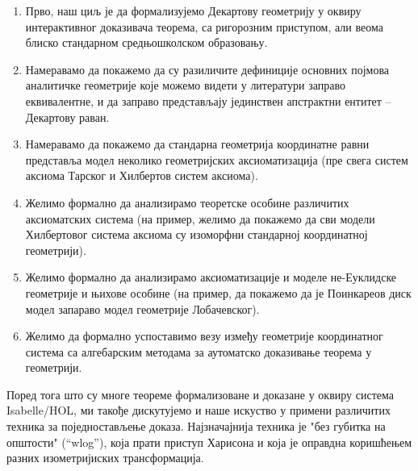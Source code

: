 \documentclass[a4paper, 12pt]{article}
\begin{document}
\begin{enumerate}
\item Прво, наш циљ је да формализујемо Декартову геометрију у оквиру
      интерактивног доказивача теорема, са ригорозним приступом, али веома блиско
      стандарном средњошколском образовању.
\item Намеравамо да покажемо да су разиличите дефиниције основних појмова
      аналитичке геометрије које можемо видети у литератури заправо еквивалентне,
      и да заправо представљају јединствен апстрактни ентитет -- Декартову раван.
\item Намеравамо да покажемо да стандарна геометрија координатне равни
      представља модел неколико геометријских аксиоматизација (пре свега
      систем аксиома Тарског и Хилбертов систем аксиома).
\item Желимо формално да анализирамо теоретске особине различитих аксиоматских система
      (на пример, желимо да покажемо да сви модели Хилбертовог система аксиома су
      изоморфни стандарној координатној геометрији).
\item Желимо формално да анализирамо аксиоматизације и моделе не-Еуклидске геометрије
      и њихове особине (на пример, да покажемо да је Поинкареов диск модел запараво модел
      геометрије Лобачевског).
\item Желимо да формално успоставимо везу између геометрије координатног система са
      алгебарским методама за аутоматско доказивање теорема у геометрији.
\end{enumerate}



Поред тога што су многе теореме формализоване и доказане у оквиру
система {\lat Isabelle/HOL}, ми такође дискутујемо и наше искуство у
примени различитих техника за поједностављење доказа.  Најзначајнија
техника је "без губитка на општости" (``{\lat wlog}''), која прати приступ
Харисона\cite{wlog} и која је оправдна коришћењем разних
изометријиских трансформација.

\end{document}
